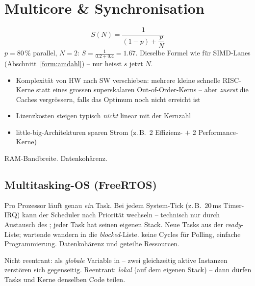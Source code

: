 \section{Multicore \& Synchronisation}
\label{sec:multicore}

\begin{formel}
\[S(N)=\frac{1}{(1-p)+\dfrac{p}{N}}\]
$p=80\,\%$ parallel, $N=2$:
$S=\frac{1}{0.2+0.4}=1.67$. Dieselbe Formel wie für SIMD-Lanes
(Abschnitt~\ref{form:amdahl}) -- nur heisst $s$ jetzt $N$.
\end{formel}

\begin{itemize}
\item Komplexität von HW nach SW verschieben: mehrere kleine schnelle
      RISC-Kerne statt eines grossen superskalaren Out-of-Order-Kerns
      -- aber \emph{zuerst} die Caches vergrössern, falls das Optimum
      noch nicht erreicht ist
\item Lizenzkosten steigen typisch \emph{nicht} linear mit der Kernzahl
\item little-big-Architekturen sparen Strom (z.\,B.\ 2 Effizienz- $+$
      2 Performance-Kerne)
\end{itemize}
 RAM-Bandbreite.  Datenkohärenz.

\subsection{Multitasking-OS (FreeRTOS)}
Pro Prozessor läuft genau \emph{ein} Task. Bei jedem System-Tick (z.\,B.\
20\,ms Timer-IRQ) kann der Scheduler nach Priorität wechseln -- technisch
nur durch Austausch des \T{Stackpointers}; jeder Task hat seinen eigenen
Stack. Neue Tasks aus der \emph{ready}-Liste; wartende wandern in die
\emph{blocked}-Liste.
 keine Cycles für Polling, einfache Programmierung.
 Datenkohärenz und geteilte Ressourcen.

\begin{falle}
Nicht reentrant:  als \emph{globale} Variable in  --
zwei gleichzeitig aktive Instanzen zerstören sich gegenseitig.
Reentrant:  \emph{lokal} (auf dem eigenen Stack) -- dann dürfen
Tasks und Kerne denselben Code teilen.
\end{falle}


